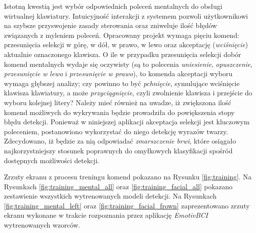 \documentclass[skorowidz,skroty]{dyplomWEZUT}
\begin{document}
Istotną kwestią jest wybór odpowiednich poleceń mentalnych do obsługi wirtualnej klawiatury. Intuicyjność interakcji z systemem pozwoli użytkownikowi na szybsze przyswojenie zasady sterowania oraz zniweluje ilość błędów związanych z myleniem poleceń. Opracowany projekt wymaga pięciu komend: przesunięcia selekcji w górę, w dół, w prawo, w lewo oraz akceptację (\textit{wciśnięcie}) aktualnie oznaczonego klawisza. O ile w przypadku przesunięcia selekcji dobór komend mentalnych wydaje się oczywisty (są to polecenia \textit{uniesienie}, \textit{opuszczenie}, \textit{przesunięcie w lewo} i \textit{przesunięcie w prawo}), to komenda akceptacji wyboru wymaga głębszej analizy; czy powinno to być \textit{pchnięcie}, symulujące wciśnięcie klawisza klawiatury, a może \textit{przyciągnięcie}, czyli zwolnienie klawisza i przejście do wyboru kolejnej litery? Należy mieć również na uwadze, iż zwiększona ilość komend możliwych do wykrywania będzie prowadziła do powiększenia stopy błędu detekcji. Ponieważ w niniejszej aplikacji akceptacja selekcji jest kluczowym poleceniem, postanowiono wykorzystać do niego detekcję wyrazów twarzy. Zdecydowano, iż będzie za nią odpowiadać \textit{zmarszczenie brwi}, które osiągało najkorzystniejszy stosunek poprawnych do omyłkowych klasyfikacji spośród dostępnych możliwości detekcji.

Zrzuty ekranu z procesu treningu komend pokazano na Rysunku \vref{fig:training}. Na Rysunkach \vref{fig:training_mental_all} oraz \vref{fig:training_facial_all} pokazano zestawienie wszystkich wytrenowanych modeli detekcji. Na Rysunkach \vref{fig:training_mental_left} oraz \vref{fig:training_facial_frown} zaprezentowano zrzuty ekranu wykonane w trakcie rozpoznania przez aplikację \textit{EmotivBCI} wytrenowanych wzorców.
\end{document}
